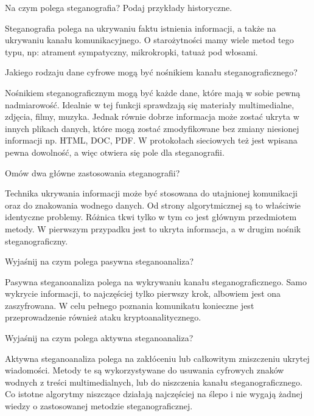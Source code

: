 \documentclass[answers,11pt]{exam}
\begin{document}
\begin{questions}

\question Na czym polega steganografia? Podaj przykłady historyczne.
\begin{solution}
Steganografia polega na ukrywaniu faktu istnienia informacji, a także na ukrywaniu kanału komunikacyjnego. O starożytności mamy wiele metod tego typu, np: atrament sympatyczny, mikrokropki, tatuaż pod włosami.
\end{solution}

\question Jakiego rodzaju dane cyfrowe mogą być nośnikiem kanału steganograficznego?
\begin{solution}
Nośnikiem steganograficznym mogą być każde dane, które mają w sobie pewną nadmiarowość. Idealnie w tej funkcji sprawdzają się materiały multimedialne, zdjęcia, filmy, muzyka. Jednak równie dobrze informacja może zostać ukryta w innych plikach danych, które mogą zostać zmodyfikowane bez zmiany niesionej informacji np. HTML, DOC, PDF. W protokołach sieciowych też jest wpisana pewna dowolność, a więc otwiera się pole dla steganografii. 
\end{solution}

\question Omów dwa główne zastosowania steganografii?
\begin{solution}
Technika ukrywania informacji może być stosowana do utajnionej komunikacji oraz do znakowania wodnego danych. Od strony algorytmicznej są to właściwie identyczne problemy. Różnica tkwi tylko w tym co jest głównym przedmiotem metody. W pierwszym przypadku jest to ukryta informacja, a w drugim nośnik steganograficzny. 
\end{solution}

\question Wyjaśnij na czym polega pasywna steganoanaliza?
\begin{solution}
Pasywna steganoanaliza polega na wykrywaniu kanału steganograficznego. Samo wykrycie informacji, to najczęściej tylko pierwszy krok, albowiem jest ona zaszyfrowana. W celu pełnego poznania komunikatu konieczne jest przeprowadzenie również ataku kryptoanalitycznego.
\end{solution}

\question Wyjaśnij na czym polega aktywna steganoanaliza?
\begin{solution}
Aktywna steganoanaliza polega na zakłóceniu lub całkowitym zniszczeniu ukrytej wiadomości. Metody te są wykorzystywane do usuwania cyfrowych znaków wodnych z treści multimedialnych, lub do niszczenia kanału steganograficznego. Co istotne algorytmy niszczące działają najczęściej na ślepo i nie wygają żadnej wiedzy o zastosowanej metodzie steganograficznej.  
\end{solution}


\end{questions}
\end{document}
